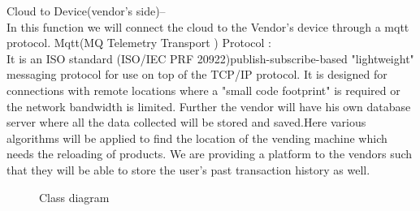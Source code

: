 \documentclass[oneside,a4paper,12pt]{report}
\begin{document}
Cloud to Device(vendor's side)--\\
In this function we will connect the cloud to the Vendor's device through a mqtt protocol.
Mqtt(MQ Telemetry Transport ) Protocol :\\
It is an ISO standard (ISO/IEC PRF 20922)publish-subscribe-based "lightweight" messaging protocol for use on top of the TCP/IP protocol. It is designed for connections with remote locations where a "small code footprint" is required or the network bandwidth is limited.
Further the vendor will have his own database server where all the data collected will be stored and saved.Here various algorithms will be applied to find the location of the vending machine which needs the reloading of products.
We are providing a platform to the vendors such that they will be able to store the user's past transaction history as well.\\


\begin{center}
	\begin{figure}[!htbp]
		\centering
	  \caption{Class diagram}
	  \label{fig:act-dig}
	\end{figure}
\end{center}  
\newpage 
\end{document}
